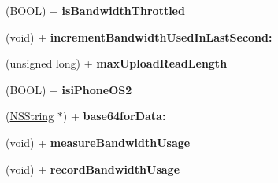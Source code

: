 \begin{DoxyCompactItemize}
\item 
\hypertarget{interface_a_s_i_h_t_t_p_request_a491d9c50c9e9f3a14a04589182df4ea8}{
(BOOL) + {\bfseries isBandwidthThrottled}}
\label{interface_a_s_i_h_t_t_p_request_a491d9c50c9e9f3a14a04589182df4ea8}

\item 
\hypertarget{interface_a_s_i_h_t_t_p_request_a0dd9a55c94f4d564a49799a7cfca9cdc}{
(void) + {\bfseries incrementBandwidthUsedInLastSecond:}}
\label{interface_a_s_i_h_t_t_p_request_a0dd9a55c94f4d564a49799a7cfca9cdc}

\item 
\hypertarget{interface_a_s_i_h_t_t_p_request_a0a96f075234703cd98779f82460122f2}{
(unsigned long) + {\bfseries maxUploadReadLength}}
\label{interface_a_s_i_h_t_t_p_request_a0a96f075234703cd98779f82460122f2}

\item 
\hypertarget{interface_a_s_i_h_t_t_p_request_a6a734f775a6b3584082cbcaa779ab831}{
(BOOL) + {\bfseries isiPhoneOS2}}
\label{interface_a_s_i_h_t_t_p_request_a6a734f775a6b3584082cbcaa779ab831}

\item 
\hypertarget{interface_a_s_i_h_t_t_p_request_a3a2eb4f44ccebdffb14242a1bcb2d3bd}{
(\hyperlink{class_n_s_string}{NSString} $\ast$) + {\bfseries base64forData:}}
\label{interface_a_s_i_h_t_t_p_request_a3a2eb4f44ccebdffb14242a1bcb2d3bd}

\item 
\hypertarget{interface_a_s_i_h_t_t_p_request_ae002cae4049589d09b529b25d0a4df61}{
(void) + {\bfseries measureBandwidthUsage}}
\label{interface_a_s_i_h_t_t_p_request_ae002cae4049589d09b529b25d0a4df61}

\item 
\hypertarget{interface_a_s_i_h_t_t_p_request_a9bfa27b53cfee20fcb4353aaa1fe015b}{
(void) + {\bfseries recordBandwidthUsage}}
\label{interface_a_s_i_h_t_t_p_request_a9bfa27b53cfee20fcb4353aaa1fe015b}

\end{DoxyCompactItemize}
